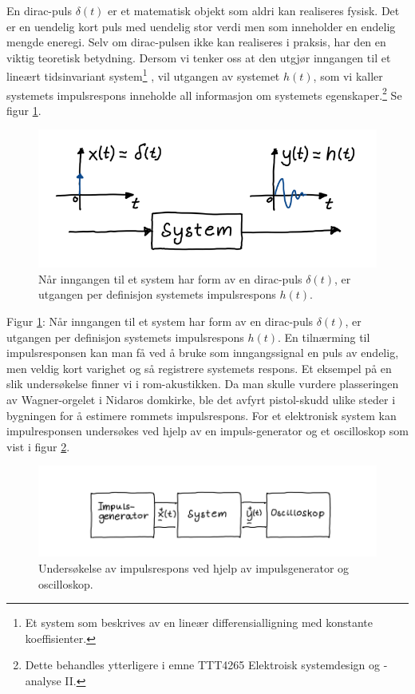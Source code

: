\documentclass[a4paper,11pt,norsk]{article}
\begin{document}
En dirac-puls $\delta(t)$ er et matematisk objekt som aldri kan realiseres fysisk. Det er en uendelig
kort puls med uendelig stor verdi men som inneholder en endelig mengde eneregi.
Selv om dirac-pulsen ikke kan realiseres i praksis, har den en viktig teoretisk betydning. Dersom vi
tenker oss at den utgjør inngangen til et lineært tidsinvariant system\footnote{Et system som beskrives av en lineær differensialligning med konstante koeffisienter.
}
, vil utgangen av systemet
$h(t)$, som vi kaller systemets impulsrespons inneholde all informasjon om systemets egenskaper.\footnote{Dette behandles ytterligere i emne TTT4265 Elektroisk systemdesign og -analyse II.}
Se figur \ref{fig:1}.

\begin{figure}[H]
  \centering
  \includegraphics[scale=0.7]{D1/Images/figur 1.png}
  \caption{Når inngangen til et system har form av en dirac-puls $\delta(t)$, er utgangen per definisjon
systemets impulsrespons $h(t)$.}
  \label{fig:1}
\end{figure}

Figur \ref{fig:1}: Når inngangen til et system har form av en dirac-puls $δ(t)$, er utgangen per definisjon
systemets impulsrespons $h(t)$.
En tilnærming til impulsresponsen kan man få ved å bruke som inngangssignal en puls av endelig,
men veldig kort varighet og så registrere systemets respons. Et eksempel på en slik undersøkelse
finner vi i rom-akustikken. Da man skulle vurdere plasseringen av Wagner-orgelet i Nidaros domkirke, ble det avfyrt pistol-skudd ulike steder i bygningen for å estimere rommets impulsrespons.
For et elektronisk system kan impulresponsen undersøkes ved hjelp av en impuls-generator og et
oscilloskop som vist i figur \ref{fig:2}.

\begin{figure}[H]
  \centering
  \includegraphics[scale=0.7]{D1/Images/figur 2.png}
  \caption{Undersøkelse av impulsrespons ved hjelp av impulsgenerator og oscilloskop.}
  \label{fig:2}
\end{figure}
\end{document}
